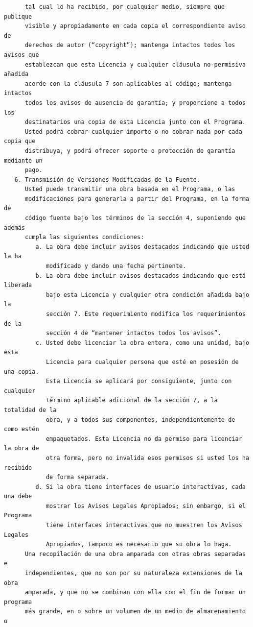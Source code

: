 \begin{verbatim}
      tal cual lo ha recibido, por cualquier medio, siempre que publique
      visible y apropiadamente en cada copia el correspondiente aviso de
      derechos de autor (“copyright”); mantenga intactos todos los avisos que
      establezcan que esta Licencia y cualquier cláusula no-permisiva añadida
      acorde con la cláusula 7 son aplicables al código; mantenga intactos
      todos los avisos de ausencia de garantía; y proporcione a todos los
      destinatarios una copia de esta Licencia junto con el Programa.
      Usted podrá cobrar cualquier importe o no cobrar nada por cada copia que
      distribuya, y podrá ofrecer soporte o protección de garantía mediante un
      pago.
   6. Transmisión de Versiones Modificadas de la Fuente.
      Usted puede transmitir una obra basada en el Programa, o las
      modificaciones para generarla a partir del Programa, en la forma de
      código fuente bajo los términos de la sección 4, suponiendo que además
      cumpla las siguientes condiciones:
         a. La obra debe incluir avisos destacados indicando que usted la ha
            modificado y dando una fecha pertinente.
         b. La obra debe incluir avisos destacados indicando que está liberada
            bajo esta Licencia y cualquier otra condición añadida bajo la
            sección 7. Este requerimiento modifica los requerimientos de la
            sección 4 de “mantener intactos todos los avisos”.
         c. Usted debe licenciar la obra entera, como una unidad, bajo esta
            Licencia para cualquier persona que esté en posesión de una copia.
            Esta Licencia se aplicará por consiguiente, junto con cualquier
            término aplicable adicional de la sección 7, a la totalidad de la
            obra, y a todos sus componentes, independientemente de como estén
            empaquetados. Esta Licencia no da permiso para licenciar la obra de
            otra forma, pero no invalida esos permisos si usted los ha recibido
            de forma separada.
         d. Si la obra tiene interfaces de usuario interactivas, cada una debe
            mostrar los Avisos Legales Apropiados; sin embargo, si el Programa
            tiene interfaces interactivas que no muestren los Avisos Legales
            Apropiados, tampoco es necesario que su obra lo haga.
      Una recopilación de una obra amparada con otras obras separadas e
      independientes, que no son por su naturaleza extensiones de la obra
      amparada, y que no se combinan con ella con el fin de formar un programa
      más grande, en o sobre un volumen de un medio de almacenamiento o

\end{verbatim}
